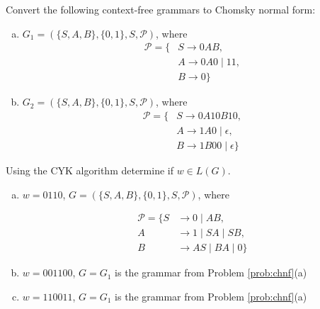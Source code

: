 \documentclass[a4paper,12pt]{amsart}
\begin{document}
\medskip\begin{problem}

    \label{prob:chnf}
    Convert the following context-free grammars to Chomsky normal form:
    
    \begin{multicols}{2}
        \begin{enumerate}[(a)]    
            \item $G_1=(\{S,A,B\},\{0,1\},S,\mathcal P)$, where
            \begin{align*}
                \mathcal P=\{&S\rightarrow 0AB, \\
                &A\rightarrow 0A0\mid 11,\\
                &B\rightarrow 0\}
            \end{align*}
    
            \item $G_2=(\{S,A,B\},\{0,1\},S,\mathcal P)$, where
            \begin{align*}            
                \mathcal P=\{
                &S\rightarrow 0A10B10, \\
                &A\rightarrow 1A0\mid \epsilon,\\
                &B\rightarrow 1B00\mid \epsilon\} 
            \end{align*}
        \end{enumerate}
    \end{multicols}
        
\end{problem}


\medskip\begin{problem}
    
    Using the CYK algorithm determine if $w\in L(G)$.

    \begin{enumerate}[(a)]\setlength{\itemsep}{6pt}
        
        \item $w=0110$, $G=(\{S,A,B\},\{0, 1\},S,\mathcal P)$, where      
        
        \begin{align*}
            \mathcal P=\{S&\rightarrow 0\mid AB, \\
            A&\rightarrow 1\mid SA\mid SB, \\
            B&\rightarrow AS \mid BA \mid 0\}
        \end{align*}

        \item $w=001100$, $G=G_1$ is the grammar from Problem \ref{prob:chnf}(a)
        
        \item $w=110011$, $G=G_1$ is the grammar from Problem \ref{prob:chnf}(a)
        
    \end{enumerate}
       

\end{problem}
\end{document}
